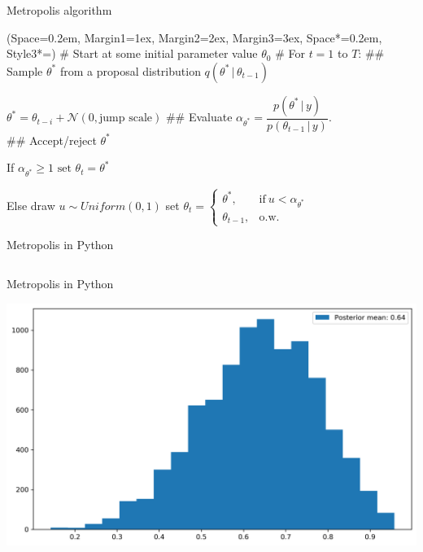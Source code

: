 \documentclass[12pt, aspectratio=149]{beamer}
\newcommand{\listSpace}{0.2em}
\theoremstyle{plain}
\begin{document}
\begin{frame}[fragile]{Metropolis algorithm}
	\begin{easylist}[enumerate]
		\ListProperties(Space=\listSpace, Margin1=1ex, Margin2=2ex, Margin3=3ex, Space*=\listSpace, Style3*=\space)
		# Start at some initial parameter value $\theta_0$
		# For $t=1$ to $T$:
		## Sample $\theta^*$ from a proposal distribution $q(\theta^* \, \vert \, \theta_{t-1})$
  
		\quad  $\theta^* = \theta_{t-i} + \mathcal{N}(0, \text{jump scale})$
		## Evaluate $\alpha_{\theta^*}= \dfrac{p(\theta^* \, \vert \, y)}{p(\theta_{t-1} \, \vert \, y)}$.\\
		## Accept/reject $\theta^*$    
  
		\quad If $\alpha_{\theta^*} \geq 1 \text{ set } \theta_t=\theta^*$   
  
		\quad Else draw  $u \sim Uniform(0, 1)$
		\quad  set $\theta_t = \begin{cases}\theta^*, &\text{if}\ u < \alpha_{\theta^*} \\ \theta_{t-1}, &\text{o.w.}\ \end{cases}$

	\end{easylist}
\end{frame}

\begin{frame}[fragile]{Metropolis in Python}
	\begin{center}
		\inputminted[fontsize=\tiny]{python}{../code/metropolis.py}
	\end{center}
\end{frame}

\begin{frame}[fragile]{Metropolis in Python}
	\begin{center}
		\includegraphics[width=.7\textwidth]{figs/metropolis.png}
	\end{center}
\end{frame}
\end{document}
